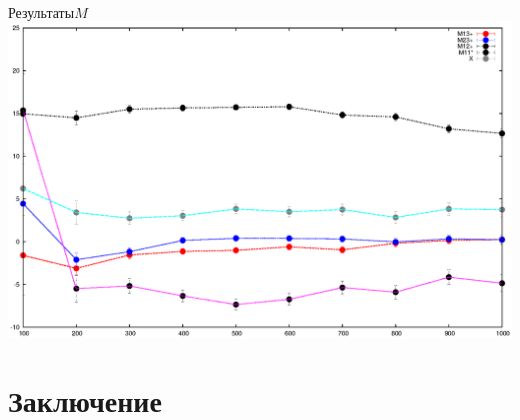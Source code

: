 \documentclass{beamer}
\begin{document}
\begin{frame}{Результаты}{$M$}
\includegraphics[width=1\linewidth]{./graphs/M100.eps}
\end{frame}
\section{Заключение}
\end{document}
